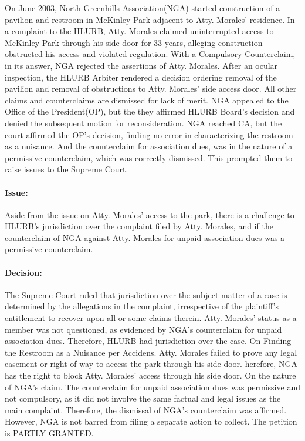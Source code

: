 \documentclass[
12pt,
oneside,
onehalfspacing,
headsepline
]{DigestCollection}
\begin{document}
On June 2003, North Greenhills Association(NGA) started construction of a pavilion and restroom in McKinley Park adjacent to Atty. Morales' residence. In a complaint to the HLURB, Atty. Morales claimed uninterrupted access to McKinley Park through his side door for 33 years, alleging construction obstructed his access and violated regulation. With a Compulsory Counterclaim, in its answer, NGA rejected the assertions of Atty. Morales. After an ocular inspection, the HLURB Arbiter rendered a decision ordering removal of the pavilion and removal of obstructions to Atty. Morales' side access door. All other claims and counterclaims are dismissed for lack of merit. NGA appealed to the Office of the President(OP), but the they affirmed HLURB Board's decision and denied the subsequent motion for reconsideration. NGA reached CA, but the court affirmed the OP's decision, finding no error in characterizing the restroom as a nuisance. And the counterclaim for association dues, was in the nature of a permissive counterclaim, which was correctly dismissed. This prompted them to raise issues to the Supreme Court.

\paragraph{Issue:}

Aside from the issue on Atty. Morales' access to the park, there is a challenge to HLURB's jurisdiction over the complaint filed by Atty. Morales, and if the counterclaim of NGA against Atty. Morales for unpaid association dues was a permissive counterclaim.

\paragraph{Decision:}


The Supreme Court ruled that jurisdiction over the subject matter of a case is determined by the allegations in the complaint, irrespective of the plaintiff's entitlement to recover upon all or some claims therein. Atty. Morales' status as a member was not questioned, as evidenced by NGA's counterclaim for unpaid association dues. Therefore, HLURB had jurisdiction over the case. On Finding the Restroom as a Nuisance per Accidens. Atty. Morales failed to prove any legal easement or right of way to access the park through his side door. herefore, NGA has the right to block Atty. Morales' access through his side door. On the nature of NGA's claim. The counterclaim for unpaid association dues was permissive and not compulsory, as it did not involve the same factual and legal issues as the main complaint. Therefore, the dismissal of NGA's counterclaim was affirmed. However, NGA is not barred from filing a separate action to collect. The petition is PARTLY GRANTED.
\end{document}
